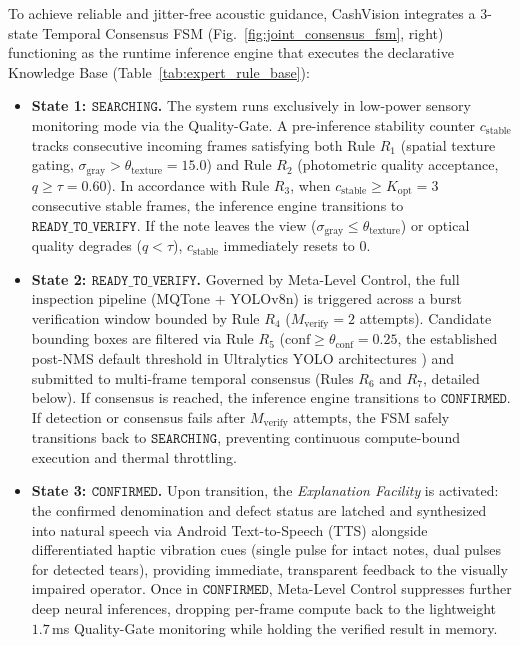 \documentclass[final,5p,times,twocolumn,authoryear]{elsarticle}
\begin{document}
To achieve reliable and jitter-free acoustic guidance, CashVision integrates a 3-state Temporal Consensus FSM (Fig.~\ref{fig:joint_consensus_fsm}, right) functioning as the runtime inference engine that executes the declarative Knowledge Base (Table~\ref{tab:expert_rule_base}):
\begin{itemize}
    \item \textbf{State 1: $\texttt{SEARCHING}$.} The system runs exclusively in low-power sensory monitoring mode via the Quality-Gate. A pre-inference stability counter $c_{\text{stable}}$ tracks consecutive incoming frames satisfying both Rule $R_1$ (spatial texture gating, $\sigma_{\text{gray}} > \theta_{\text{texture}} = 15.0$) and Rule $R_2$ (photometric quality acceptance, $q \ge \tau = 0.60$). In accordance with Rule $R_3$, when $c_{\text{stable}} \ge K_{\text{opt}} = 3$ consecutive stable frames, the inference engine transitions to $\texttt{READY\_TO\_VERIFY}$. If the note leaves the view ($\sigma_{\text{gray}} \le \theta_{\text{texture}}$) or optical quality degrades ($q < \tau$), $c_{\text{stable}}$ immediately resets to 0.
    \item \textbf{State 2: $\texttt{READY\_TO\_VERIFY}$.} Governed by Meta-Level Control, the full inspection pipeline (MQTone + YOLOv8n) is triggered across a burst verification window bounded by Rule $R_4$ ($M_{\text{verify}} = 2$ attempts). Candidate bounding boxes are filtered via Rule $R_5$ ($\text{conf} \ge \theta_{\text{conf}} = 0.25$, the established post-NMS default threshold in Ultralytics YOLO architectures \cite{Jocher2023}) and submitted to multi-frame temporal consensus (Rules $R_6$ and $R_7$, detailed below). If consensus is reached, the inference engine transitions to $\texttt{CONFIRMED}$. If detection or consensus fails after $M_{\text{verify}}$ attempts, the FSM safely transitions back to $\texttt{SEARCHING}$, preventing continuous compute-bound execution and thermal throttling.
    \item \textbf{State 3: $\texttt{CONFIRMED}$.} Upon transition, the \textit{Explanation Facility} is activated: the confirmed denomination and defect status are latched and synthesized into natural speech via Android Text-to-Speech (TTS) alongside differentiated haptic vibration cues (single pulse for intact notes, dual pulses for detected tears), providing immediate, transparent feedback to the visually impaired operator. Once in $\texttt{CONFIRMED}$, Meta-Level Control suppresses further deep neural inferences, dropping per-frame compute back to the lightweight $1.7$\,ms Quality-Gate monitoring while holding the verified result in memory.
    

\end{itemize}
\end{document}
